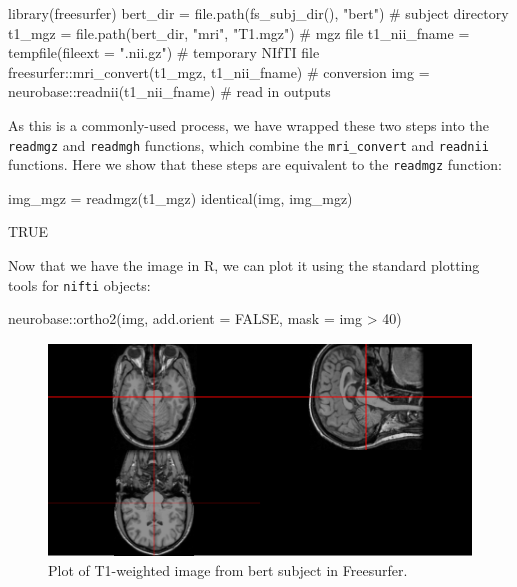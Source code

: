 \begin{Schunk}
\begin{Sinput}
library(freesurfer)
bert_dir = file.path(fs_subj_dir(), "bert") # subject directory
t1_mgz = file.path(bert_dir, "mri", "T1.mgz") # mgz file
t1_nii_fname = tempfile(fileext = ".nii.gz") # temporary NIfTI file
freesurfer::mri_convert(t1_mgz, t1_nii_fname) # conversion
img = neurobase::readnii(t1_nii_fname) # read in outputs
\end{Sinput}
\end{Schunk}

As this is a commonly-used process, we have wrapped these two steps into
the \texttt{readmgz} and \texttt{readmgh} functions, which combine the
\texttt{mri\_convert} and \texttt{readnii} functions. Here we show that
these steps are equivalent to the \texttt{readmgz} function:

\begin{Schunk}
\begin{Sinput}
img_mgz = readmgz(t1_mgz)
identical(img, img_mgz)
\end{Sinput}
\begin{Soutput}
[1] TRUE
\end{Soutput}
\end{Schunk}

Now that we have the image in R, we can plot it using the standard
plotting tools for \texttt{nifti} objects:

\begin{Schunk}
\begin{Sinput}
neurobase::ortho2(img, add.orient = FALSE, mask = img > 40)
\end{Sinput}
\begin{figure}
\includegraphics{muschelli_files/figure-latex/mri_plot-1} \caption[Plot of T1-weighted image from bert subject in Freesurfer]{Plot of T1-weighted image from bert subject in Freesurfer.}\label{fig:mri_plot}
\end{figure}
\end{Schunk}

